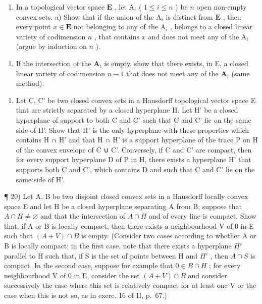 \begin{enumerate}
\item
  In a topological vector space \(\mathbf{E}\) , let \(\mathrm{A}_i\) ( \(1 \leqslant i \leqslant n\) ) be \(n\) open non-empty convex sets. a) Show that if the union of the \(\mathrm{A}_i\) is distinct from \(\mathbf{E}\) , then every point \(x \in \mathbf{E}\) not belonging to any of the \(\mathrm{A}_i\) , belongs to a closed linear variety of codimension \(n\) , that contains \(x\) and does not meet any of the \(\mathrm{A}_i\) (argue by induction on \(n\) ).
\end{enumerate}

\begin{enumerate}
\def\labelenumi{\alph{enumi})}
\setcounter{enumi}{1}
\tightlist
\item
  If the intersection of the \(\mathbf{A}_i\) is empty, show that there exists, in E, a closed linear variety of codimension \(n - 1\) that does not meet any of the \(\mathbf{A}_i\) (same method).
\end{enumerate}

\begin{enumerate}
\def\labelenumi{\arabic{enumi})}
\setcounter{enumi}{18}
\tightlist
\item
  Let C, C' be two closed convex sets in a Hausdorff topological vector space E that are strictly separated by a closed hyperplane H. Let H' be a closed hyperplane of support to both C and C' such that C and C' lie on the same side of H'. Show that H' is the only hyperplane with these properties which contains H ∩ H' and that H ∩ H' is a support hyperplane of the trace P on H of the convex envelope of C ∪ C'. Conversely, if C and C' are compact, then for every support hyperplane D of P in H, there exists a hyperplane H' that supports both C and C', which contains D and such that C and C' lie on the same side of H'.
\end{enumerate}

¶ 20) Let A, B be two disjoint closed convex sets in a Hausdorff locally convex space E and let H be a closed hyperplane separating A from B; suppose that \(A \cap H \neq \varnothing\) and that the intersection of \(A \cap H\) and of every line is compact. Show that, if A or B is locally compact, then there exists a neighbourhood V of 0 in E such that \((A + V) \cap B\) is empty. (Consider two cases according to whether A or B is locally compact; in the first case, note that there exists a hyperplane \(H'\) parallel to H such that, if S is the set of points between H and \(H'\) , then \(A \cap S\) is compact. In the second case, suppose for example that \(0 \in B \cap H\) ; for every neighbourhood V of 0 in E, consider the set \((A + V) \cap B\) and consider successively the case where this set is relatively compact for at least one V or the case when this is not so, as in exerc. 16 of II, p.~67.)

